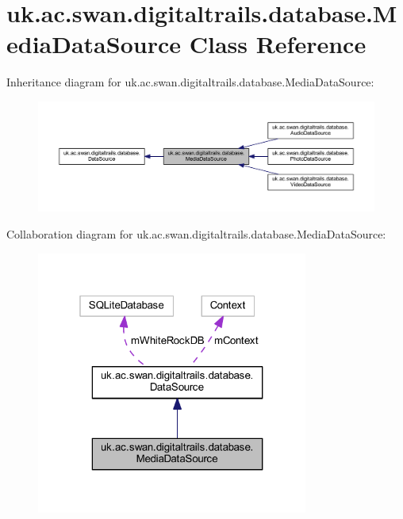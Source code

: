 \hypertarget{classuk_1_1ac_1_1swan_1_1digitaltrails_1_1database_1_1_media_data_source}{\section{uk.\+ac.\+swan.\+digitaltrails.\+database.\+Media\+Data\+Source Class Reference}
\label{classuk_1_1ac_1_1swan_1_1digitaltrails_1_1database_1_1_media_data_source}
}


Inheritance diagram for uk.\+ac.\+swan.\+digitaltrails.\+database.\+Media\+Data\+Source\+:\nopagebreak
\begin{figure}[H]
\begin{center}
\leavevmode
\includegraphics[width=350pt]{classuk_1_1ac_1_1swan_1_1digitaltrails_1_1database_1_1_media_data_source__inherit__graph}
\end{center}
\end{figure}


Collaboration diagram for uk.\+ac.\+swan.\+digitaltrails.\+database.\+Media\+Data\+Source\+:\nopagebreak
\begin{figure}[H]
\begin{center}
\leavevmode
\includegraphics[width=253pt]{classuk_1_1ac_1_1swan_1_1digitaltrails_1_1database_1_1_media_data_source__coll__graph}
\end{center}
\end{figure}

